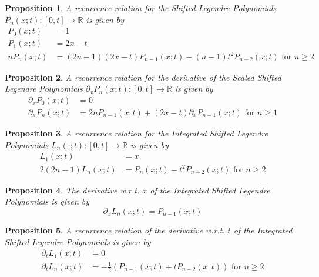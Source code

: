\documentclass[10pt,a4paper]{article}
\newtheorem{prop}{Proposition}
\begin{document}
    \begin{prop}
        A recurrence relation for the \textit{Shifted Legendre Polynomials} $P_n(x;t) : [0,t] \to \mathbb{R}$ is given by
        \begin{align*}
            P_0(x;t) &= 1 \\
            P_1(x;t) &= 2x - t \\
            nP_n(x;t) &= (2n-1)(2x-t)P_{n-1}(x;t) - (n-1)t^2P_{n-2}(x;t) \mbox{ for } n \geq 2
        \end{align*}
    \end{prop}

    \begin{prop}
        A recurrence relation for the derivative of the \textit{Scaled Shifted Legendre Polynomials} $\partial_x P_n(x;t) : [0,t] \to \mathbb{R}$ is given by
        \begin{align*}
            \partial_x P_0(x;t) &= 0 \\
            \partial_x P_n(x;t) &= 2nP_{n-1}(x;t) + (2x-t)\partial_xP_{n-1}(x;t) \mbox{ for } n \geq 1
        \end{align*}
    \end{prop}

    \begin{prop}
        A recurrence relation for the \textit{Integrated Shifted Legendre Polynomials} $L_n(\cdot;t) : [0, t] \to \mathbb{R}$ is given by
        \begin{align*}
            L_1(x;t) &= x \\
            2(2n-1)L_n(x;t) &= P_n(x;t) - t^2P_{n-2}(x;t) \mbox{ for } n \geq 2
        \end{align*}
    \end{prop}

    \begin{prop}
        The derivative w.r.t. $x$ of the Integrated Shifted Legendre Polynomials is given by
        \begin{equation*}
            \partial_x L_n(x;t) = P_{n-1}(x;t)
        \end{equation*}
    \end{prop}

    \begin{prop}
        A recurrence relation of the derivative w.r.t. $t$ of the Integrated Shifted Legendre Polynomials is given by
        \begin{align*}
            \partial_t L_1(x;t) &= 0 \\
            \partial_t L_n(x;t) &= -\frac{1}{2} \left( P_{n-1}(x;t) + tP_{n-2}(x;t) \right) \mbox{ for } n \geq 2
        \end{align*}
    \end{prop}
    
\end{document}
